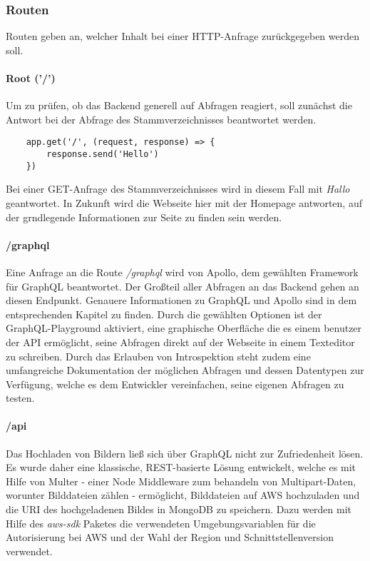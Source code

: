 \subsubsection{Routen}
Routen geben an, welcher Inhalt bei einer HTTP-Anfrage zurückgegeben werden soll.

\paragraph{Root ('/')\\}
Um zu prüfen, ob das Backend generell auf Abfragen reagiert, soll zunächst die Antwort bei der Abfrage des Stammverzeichnisses beantwortet werden.
\begin{lstlisting}
    app.get('/', (request, response) => {
        response.send('Hello')
    })
\end{lstlisting}
Bei einer GET-Anfrage des Stammverzeichnisses wird in diesem Fall mit \textit{\glqq Hallo \grqq} geantwortet. In Zukunft wird die Webseite hier mit der Homepage antworten, auf der grndlegende Informationen zur Seite zu finden sein werden.

\paragraph{/graphql\\}
Eine Anfrage an die Route \textit{/graphql} wird von Apollo, dem gewählten Framework für GraphQL beantwortet. Der Großteil aller Abfragen an das Backend gehen an diesen Endpunkt. Genauere Informationen zu GraphQL und Apollo sind in dem entsprechenden Kapitel zu finden. Durch die gewählten Optionen ist der GraphQL-Playground aktiviert, eine graphische Oberfläche die es einem benutzer der API ermöglicht, seine Abfragen direkt auf der Webseite in einem Texteditor zu schreiben. Durch das Erlauben von Introspektion steht zudem eine umfangreiche Dokumentation der möglichen Abfragen und dessen Datentypen zur Verfügung, welche es dem Entwickler vereinfachen, seine eigenen Abfragen zu testen.


\paragraph{/api\\}
Das Hochladen von Bildern ließ sich über GraphQL nicht zur Zufriedenheit lösen. Es wurde daher eine klassische, REST-basierte Lösung entwickelt, welche es mit Hilfe von Multer - einer Node Middleware zum behandeln von Multipart-Daten, worunter Bilddateien zählen - ermöglicht, Bilddateien auf AWS hochzuladen und die URI des hochgeladenen Bildes in MongoDB zu speichern. Dazu werden mit Hilfe des \textit{aws-sdk} Paketes die verwendeten Umgebungsvariablen für die Autorisierung bei AWS und der Wahl der Region und Schnittstellenversion verwendet. 

